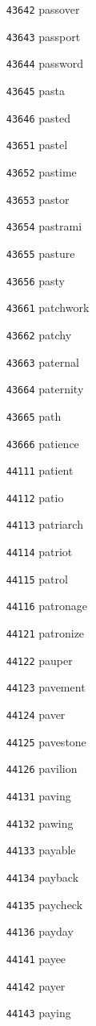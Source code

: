 \documentclass[twoside,11pt]{article}
\begin{document}
\begin{multicols}{5}
\begin{enumerate}
\item[\texttt{43642}] passover
\item[\texttt{43643}] passport
\item[\texttt{43644}] password
\item[\texttt{43645}] pasta
\item[\texttt{43646}] pasted
\item[\texttt{43651}] pastel
\item[\texttt{43652}] pastime
\item[\texttt{43653}] pastor
\item[\texttt{43654}] pastrami
\item[\texttt{43655}] pasture
\item[\texttt{43656}] pasty
\item[\texttt{43661}] patchwork
\item[\texttt{43662}] patchy
\item[\texttt{43663}] paternal
\item[\texttt{43664}] paternity
\item[\texttt{43665}] path
\item[\texttt{43666}] patience
\item[\texttt{44111}] patient
\item[\texttt{44112}] patio
\item[\texttt{44113}] patriarch
\item[\texttt{44114}] patriot
\item[\texttt{44115}] patrol
\item[\texttt{44116}] patronage
\item[\texttt{44121}] patronize
\item[\texttt{44122}] pauper
\item[\texttt{44123}] pavement
\item[\texttt{44124}] paver
\item[\texttt{44125}] pavestone
\item[\texttt{44126}] pavilion
\item[\texttt{44131}] paving
\item[\texttt{44132}] pawing
\item[\texttt{44133}] payable
\item[\texttt{44134}] payback
\item[\texttt{44135}] paycheck
\item[\texttt{44136}] payday
\item[\texttt{44141}] payee
\item[\texttt{44142}] payer
\item[\texttt{44143}] paying

\end{enumerate}
\end{multicols}
\end{document}
